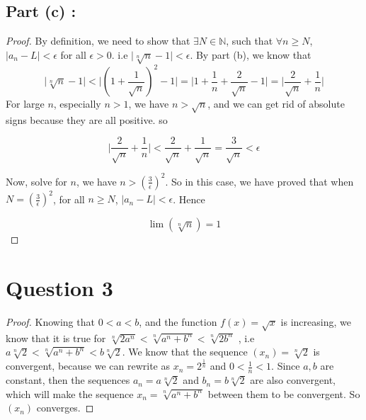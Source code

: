 \documentclass[12pt]{article}
\begin{document}
\subsection*{Part (c) :}
\begin{proof}
By definition, we need to show that $\exists N \in
\mathbb{N}$, such that $\forall n \geq N$,
$\vert a_n - L \vert < \epsilon$ for all $\epsilon
> 0$. i.e $ \vert \sqrt[n]{n} - 1 \vert < \epsilon$.
By part (b), we know that
\[\vert \sqrt[n]{n} - 1 \vert <
\displaystyle{ \Bigg| \left( 1 + \frac{1}{\sqrt{n}}
\right)^2 -1 \Bigg|} = \Bigg| 1 + \frac{1}{n} +
\frac{2}{\sqrt{n}} - 1 \Bigg| = \Bigg| 
\frac{2}{\sqrt{n}} + \frac{1}{n} \Bigg|\]
For large $n$, especially $n >1 $, we have
$ n > \sqrt{n} $, and we can get rid of absolute 
signs because they are all positive. so

\[ \Bigg| 
\frac{2}{\sqrt{n}} + \frac{1}{n} \Bigg| < 
\frac{2}{\sqrt{n}} + \frac{1}{\sqrt{n}} = \frac{3}{\sqrt{n}} < \epsilon\]

Now, solve for $n$, we have $ \displaystyle{ n >
\left( \frac{3}{\epsilon} \right)^2}$. So in this case,
we have proved that when $N = \displaystyle{ 
\left( \frac{3}{\epsilon} \right)^2}$, for all
$n \geq N$, $\vert a_n - L \vert < \epsilon$. Hence

\[ \lim \left( \sqrt[n]{n} \right) = 1 \]
\end{proof}

\newpage
\section*{Question 3}
\begin{proof}
Knowing that $0<a<b$, and the function $f(x) = \sqrt{x}$ is increasing, we
know that it is true for $\sqrt[n]{2a^n} < \sqrt[n]{a^n+b^n} < \sqrt[n]{2b^n}$
, i.e $a\sqrt[n]{2} < \sqrt[n]{a^n+b^n} < b\sqrt[n]{2}$. We know that the
sequence $(x_n) = \sqrt[n]{2}$ is convergent, because we can rewrite as
$ x_n = \displaystyle{2^{\frac{1}{n}}}$ and $\displaystyle{0< \frac{1}{n} < 1}$.
Since $a,b$ are constant, then the sequences $ a_n = a\sqrt[n]{2}$ and
$b_n = b\sqrt[n]{2}$ are also convergent, which will make the sequence
$x_n = \sqrt[n]{a^n+b^n}$ between them to be convergent. So $(x_n)$
converges.




\end{proof}
\end{document}
